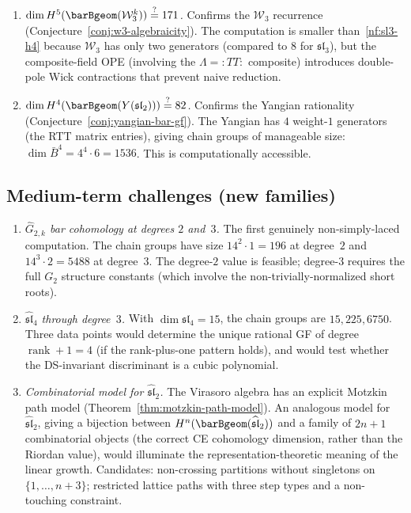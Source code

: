\begin{enumerate}[label=\textbf{NF-\arabic*.}, leftmargin=3em]
\item\label{nf:w3-h5}
\emph{$\dim H^5(\barBgeom(\mathcal{W}_3^k)) \stackrel{?}{=} 171$.}
Confirms the $\mathcal{W}_3$ recurrence (Conjecture~\ref{conj:w3-algebraicity}). The computation is smaller than~\ref{nf:sl3-h4} because $\mathcal{W}_3$ has only two generators (compared to $8$ for $\mathfrak{sl}_3$), but the composite-field OPE (involving the $\Lambda = {:}TT{:}$ composite) introduces double-pole Wick contractions that prevent naive reduction.

\item\label{nf:yangian-h4}
\emph{$\dim H^4(\barBgeom(Y(\mathfrak{sl}_2))) \stackrel{?}{=} 82$.}
Confirms the Yangian rationality (Conjecture~\ref{conj:yangian-bar-gf}). The Yangian has $4$ weight-$1$ generators (the RTT matrix entries), giving chain groups of manageable size: $\dim\bar{B}^4 = 4^4 \cdot 6 = 1536$. This is computationally accessible.
\end{enumerate}

\subsection{Medium-term challenges (new families)}

\begin{enumerate}[label=\textbf{MF-\arabic*.}, leftmargin=3em]
\item \emph{$\widehat{G}_{2,k}$ bar cohomology at degrees $2$ and~$3$.}
The first genuinely non-simply-laced computation. The chain groups have size $14^2 \cdot 1 = 196$ at degree~$2$ and $14^3 \cdot 2 = 5488$ at degree~$3$. The degree-$2$ value is feasible; degree-$3$ requires the full $G_2$ structure constants (which involve the non-trivially-normalized short roots).

\item \emph{$\widehat{\mathfrak{sl}}_4$ through degree~$3$.}
With $\dim\mathfrak{sl}_4 = 15$, the chain groups are $15, 225, 6750$. Three data points would determine the unique rational GF of degree $\operatorname{rank} + 1 = 4$ (if the rank-plus-one pattern holds), and would test whether the DS-invariant discriminant is a cubic polynomial.

\item \emph{Combinatorial model for $\widehat{\mathfrak{sl}}_2$.}
The Virasoro algebra has an explicit Motzkin path model (Theorem~\ref{thm:motzkin-path-model}). An analogous model for $\widehat{\mathfrak{sl}}_2$, giving a bijection between $H^n(\barBgeom(\widehat{\mathfrak{sl}}_2))$ and a family of $2n+1$ combinatorial objects (the correct CE cohomology dimension, rather than the Riordan value), would illuminate the representation-theoretic meaning of the linear growth. Candidates: non-crossing partitions without singletons on $\{1, \ldots, n+3\}$; restricted lattice paths with three step types and a non-touching constraint.
\end{enumerate}

